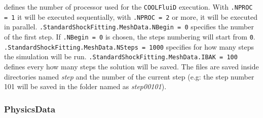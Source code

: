 \documentclass[11pt,a4paper,oneside]{article}
\begin{document}
\newline
\newline
defines the number of processor used for the \texttt{COOLFluiD} execution. 
\newline
With \texttt{.NPROC = 1} it will be executed sequentially, with \texttt{.NPROC = 2} or more, it will be executed in parallel.
\newline
\newline
\hspace*{1cm} \texttt{.StandardShockFitting.MeshData.NBegin = 0}
\newline
\newline
specifies the number of the first step. If \texttt{.NBegin = 0} is chosen, the steps numbering will start from \texttt{0}. 
\newline
\newline
\hspace*{1cm} \texttt{.StandardShockFitting.MeshData.NSteps = 1000}
\newline
\newline
specifies for how many steps the simulation will be run.
\newline
\newline
\hspace*{1cm} \texttt{.StandardShockFitting.MeshData.IBAK = 100}
\newline
\newline
defines every how many steps the solution will be saved. The files are saved inside directories named \textit{step} and the number of the current step (e.g: the step number 101 will be saved in the folder named as \textit{step00101}).

\subsubsection*{PhysicsData}
\end{document}
